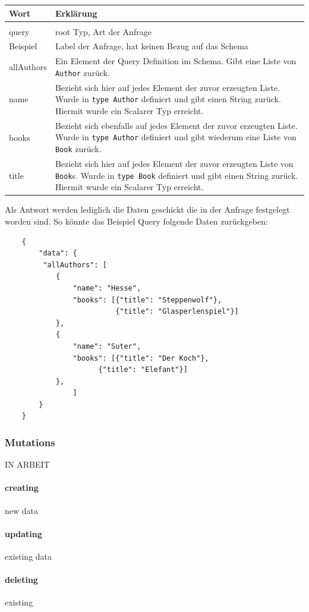 \documentclass[11pt]{article}
\begin{document}
\begin{tabularx}{1.0\textwidth}{lX}

	Wort & Erklärung \\
	\hline \\
	query & root Typ, Art der Anfrage \\
	Beispiel & Label der Anfrage, hat keinen Bezug auf das Schema \\
	allAuthors & Ein Element der Query Definition im Schema. Gibt eine Liste von \texttt{Author} zurück. \\
	name & Bezieht sich hier auf jedes Element der zuvor erzeugten Liste. Wurde in \texttt{type Author} definiert und gibt einen String zurück. Hiermit wurde ein Scalarer Typ erreicht. \\
	books & Bezieht sich ebenfalls auf jedes Element der zuvor erzeugten Liste. Wurde in \texttt{type Author} definiert und gibt wiederum eine Liste von \texttt{Book} zurück. \\
	title & Bezieht sich hier auf jedes Element der zuvor erzeugten Liste von \texttt{Book}s. Wurde in \texttt{type Book} definiert und gibt einen String zurück. Hiermit wurde ein Scalarer Typ erreicht.
\end{tabularx}

\space

\vspace{30pt}
Als Antwort werden lediglich die Daten geschickt die in der Anfrage festgelegt worden sind. So könnte das Beispiel Query folgende Daten zurückgeben:
\begin{verbatim}
	{
		"data": {
		 "allAuthors": [
			{
 				"name": "Hesse",
 				"books": [{"title": "Steppenwolf"},
 				          {"title": "Glasperlenspiel"}]
 			},
			{
 				"name": "Suter",
 				"books": [{"title": "Der Koch"},
 					  {"title": "Elefant"}]
 			},
				]
		}
	}
\end{verbatim}

\subsubsection{Mutations}
IN ARBEIT
\paragraph{creating} new data
\paragraph{updating} existing data
\paragraph{deleting} existing
\end{document}
